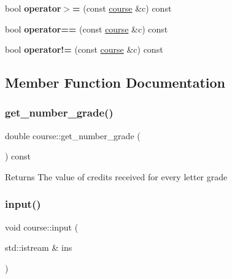 \begin{DoxyCompactItemize}
\item 
\mbox{\label{classcourse_ad15d2508cfb6d22103aaec608bcfdc74}} 
bool {\bfseries operator$>$=} (const \hyperlink{classcourse}{course} \&c) const
\item 
\mbox{\label{classcourse_aafce75fc85cdb94a5a08eaaba359da16}} 
bool {\bfseries operator==} (const \hyperlink{classcourse}{course} \&c) const
\item 
\mbox{\label{classcourse_ae01c5e2445600d485da28e0ba7c48b3a}} 
bool {\bfseries operator!=} (const \hyperlink{classcourse}{course} \&c) const
\end{DoxyCompactItemize}


\subsection{Member Function Documentation}
\mbox{\label{classcourse_aad43a6b7ce264bd4038472fc3e40cf16}} 
\subsubsection{\texorpdfstring{get\+\_\+number\+\_\+grade()}{get\_number\_grade()}}
{\footnotesize\ttfamily double course\+::get\+\_\+number\+\_\+grade (\begin{DoxyParamCaption}{ }\end{DoxyParamCaption}) const}

\begin{DoxyReturn}{Returns}
The value of credits received for every letter grade 
\end{DoxyReturn}
\mbox{\label{classcourse_a0a8839f2369903101399bca60547aed2}} 
\subsubsection{\texorpdfstring{input()}{input()}}
{\footnotesize\ttfamily void course\+::input (\begin{DoxyParamCaption}\item[{std\+::istream \&}]{ins }\end{DoxyParamCaption})}


